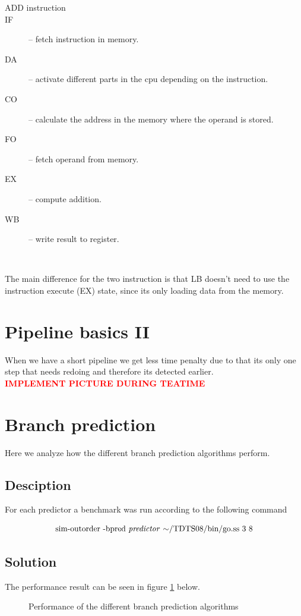 \documentclass[titlepage, a4paper]{article}
\newcommand{\todo}[1] {\textbf{\textcolor{red}{#1}}}
\begin{document}
\begin{description}
\item[ADD instruction]
\item[IF] -- fetch instruction in memory.
\item[DA] -- activate different parts in the cpu depending on the instruction.
\item[CO] -- calculate the address in the memory where the operand is stored. 
\item[FO] -- fetch operand from memory.
\item[EX] -- compute addition.
\item[WB] -- write result to register.
\end{description}
~\newline

The main difference for the two instruction is that LB doesn't need to use the instruction execute (EX) state, since its only loading data from the memory.

\section{Pipeline basics II}
When we have a short pipeline we get less time penalty due to that its only one step that needs redoing and therefore its detected earlier. \\
\todo{IMPLEMENT PICTURE DURING TEATIME}

\section{Branch prediction}
Here we analyze how the different branch prediction algorithms perform.

\subsection{Desciption}
For each predictor a benchmark was run according to the following command

$$\text{sim-outorder -bpred \textit{predictor} $\mathtt{\sim}$/TDTS08/bin/go.ss 3 8}$$


\subsection{Solution}
The performance result can be seen in figure \ref{fig:performance} below.

\begin{figure}[H]
	\centering
	\caption{Performance of the different branch prediction algorithms}
	\label{fig:performance}
\end{figure}
\end{document}
